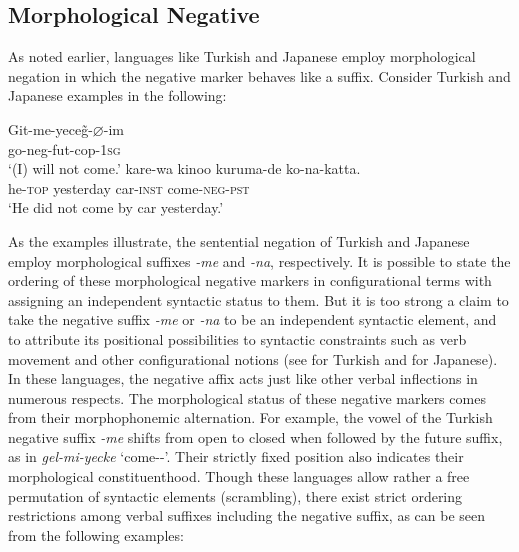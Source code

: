 \documentclass[output=paper
                ,modfonts
		,nonflat
	        ,collection
	        ,collectionchapter
	        ,collectiontoclongg
 	        ,biblatex  
                ,babelshorthands
                ,newtxmath
                ,draftmode
                ,colorlinks, citecolor=brown 
]{./langsci/langscibook}
\begin{document}
{\begin{exe}
\begin{xlist}
\begin{exe}
\begin{xlist}

\section{Morphological Negative}

As noted earlier, languages like Turkish and Japanese employ morphological negation in which the negative marker behaves like a suffix. Consider
Turkish and Japanese examples in the following:

\eal
\ex
\label{turkish-jap}
\gll Git-me-yece\~{g}-$\varnothing$-im \\
     go-{\sc neg-fut-cop}-\textsc{1sg} \\
\glt `(I) will not come.'
\ex
\gll kare-wa kinoo kuruma-de ko-na-katta. \\
     he-\textsc{top} yesterday car-\textsc{inst} come-\textsc{neg}-\textsc{pst} \\
\glt `He did not come by car yesterday.'
\zl

\noindent
As the examples illustrate, the sentential negation of Turkish and Japanese employ
morphological suffixes \emph{-me} and \emph{-na},
respectively.
It is possible to state the ordering
of these morphological negative markers in configurational
terms with assigning an independent syntactic status to them.
But it is too strong a claim to
take the negative suffix \emph{-me} or \emph{-na}  to be an independent syntactic element,
and to attribute its positional possibilities to syntactic constraints
such as verb movement and other configurational notions (see \citep{kelepir} for
Turkish and \citep{Kato:97,Kato:00} for Japanese).
%
In these languages, the negative affix acts just like
other verbal inflections in numerous respects.
%
%
%
%
%
The morphological status of
these negative markers comes from their morphophonemic alternation.
For example, the vowel of the Turkish negative suffix \emph{-me} shifts from open to closed when followed by the
future suffix, as in \emph{gel-mi-yecke} `come-\NEG-\FUT'.  Their
strictly fixed position also indicates their morphological
constituenthood. Though these languages allow rather a free permutation of
syntactic elements (scrambling), there exist strict ordering restrictions among
verbal suffixes including the negative suffix, as can be seen from
the following examples:


\end{xlist}
\end{exe}
\end{xlist}
\end{exe}}
\end{document}
